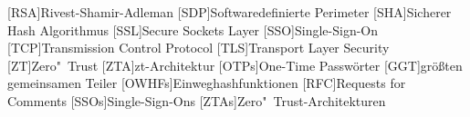 \begin{acronym}
    [RSA]{Rivest-Shamir-Adleman}
    [SDP]{Softwaredefinierte Perimeter}
    [SHA]{Sicherer Hash Algorithmus}
    [SSL]{Secure Sockets Layer}
    [SSO]{Single-Sign-On}
    [TCP]{Transmission Control Protocol}
    [TLS]{Transport Layer Security}
    [ZT]{Zero"~Trust}
    [ZTA]{\acl{zt}-Architektur}
    [OTPs]{One-Time Passwörter}
    [GGT]{größten gemeinsamen Teiler}
    [OWHFs]{Einweghashfunktionen}
    [RFC]{Requests for Comments}
    [SSOs]{Single-Sign-Ons}
    [ZTAs]{Zero"~Trust-Architekturen}
\end{acronym}